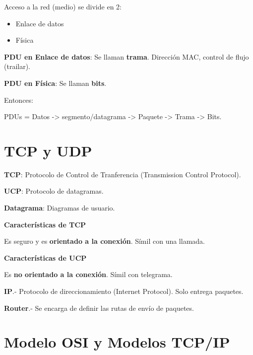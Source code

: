 \documentclass{article}
\begin{document}
Acceso a la red (medio) se divide en 2:

\begin{itemize}
	\item
	Enlace de datos
	\item
	Física
\end{itemize}
\vspace{1em}

\textbf{PDU en Enlace de datos}: Se llaman \textbf{trama}. Dirección MAC, control
de flujo (trailar).
\vspace{1em}

\textbf{PDU en Física}: Se llaman \textbf{bits}.
\vspace{1em}

Entonces:

PDUs = Datos -> segmento/datagrama -> Paquete -> Trama -> Bits.

\section{TCP y UDP}

\textbf{TCP}: Protocolo de Control de Tranferencia (Transmission Control Protocol).
\vspace{1em}

\textbf{UCP}: Protocolo de datagramas.
\vspace{1em}

\textbf{Datagrama}: Diagramas de usuario.
\vspace{1em}

\textbf{Características de TCP}
\vspace{1em}

Es seguro y es \textbf{orientado a la conexión}. Símil con una llamada.
\vspace{1em}

\textbf{Características de UCP}
\vspace{1em}

Es \textbf{no orientado a la conexión}. Símil con telegrama.
\vspace{1em}

\textbf{IP}.- Protocolo de direccionamiento (Internet Protocol). Solo entrega
paquetes.
\vspace{1em}

\textbf{Router}.- Se encarga de definir las rutas de envío de paquetes.
\vspace{1em}

\section{Modelo OSI y Modelos TCP/IP}
\end{document}
